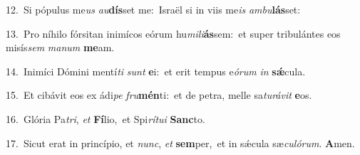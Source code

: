 {\numbfont\textcolor{\numbcolor}{12.}}~Si pópulus me\textit{us} \textit{au}\-\textbf{dís}set me:~\star Israël si in viis me\textit{is} \textit{am}\-\textit{bu}\textbf{lás}set:\par
{\numbfont\textcolor{\numbcolor}{13.}}~Pro níhilo fórsitan inimícos eórum hu\-\textit{mi}\-\textit{li}\textbf{ás}sem:~\star et super tribulántes eos misís\textit{sem} \textit{ma}\-\textit{num} \textbf{me}\-am.\par
{\numbfont\textcolor{\numbcolor}{14.}}~Inimíci Dómini mentí\textit{ti} \textit{sunt} \textbf{e}\-i:~\star et erit tempus e\-\textit{ó}\-\textit{rum} \textit{in} \textbf{sǽ}\-cula.\par
{\numbfont\textcolor{\numbcolor}{15.}}~Et cibávit eos ex ádi\textit{pe} \textit{fru}\-\textbf{mén}ti:~\star et de petra, melle sa\-\textit{tu}\-\textit{rá}\textit{vit} \textbf{e}\-os.\par
{\numbfont\textcolor{\numbcolor}{16.}}~Glória Pa\-\textit{tri}\-, \textit{et} \textbf{Fí}\-lio,~\star et Spi\-\textit{rí}\-\textit{tu}\textit{i} \textbf{Sanc}\-to.\par
{\numbfont\textcolor{\numbcolor}{17.}}~Sicut erat in princípio, et \textit{nunc}\-, \textit{et} \textbf{sem}\-per,~\star et in sǽcula sæ\-\textit{cu}\-\textit{ló}\textit{rum}. \textbf{A}\-men.\par
